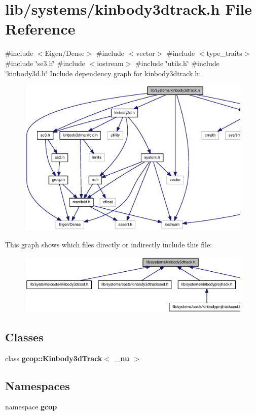 \section{lib/systems/kinbody3dtrack.h \-File \-Reference}
\label{kinbody3dtrack_8h}
{\ttfamily \#include $<$\-Eigen/\-Dense$>$}\*
{\ttfamily \#include $<$vector$>$}\*
{\ttfamily \#include $<$type\-\_\-traits$>$}\*
{\ttfamily \#include \char`\"{}se3.\-h\char`\"{}}\*
{\ttfamily \#include $<$iostream$>$}\*
{\ttfamily \#include \char`\"{}utils.\-h\char`\"{}}\*
{\ttfamily \#include \char`\"{}kinbody3d.\-h\char`\"{}}\*
\-Include dependency graph for kinbody3dtrack.\-h\-:\nopagebreak
\begin{figure}[H]
\begin{center}
\leavevmode
\includegraphics[width=350pt]{kinbody3dtrack_8h__incl}
\end{center}
\end{figure}
\-This graph shows which files directly or indirectly include this file\-:\nopagebreak
\begin{figure}[H]
\begin{center}
\leavevmode
\includegraphics[width=350pt]{kinbody3dtrack_8h__dep__incl}
\end{center}
\end{figure}
\subsection*{\-Classes}
\begin{DoxyCompactItemize}
\item 
class {\bf gcop\-::\-Kinbody3d\-Track$<$ \-\_\-nu $>$}
\end{DoxyCompactItemize}
\subsection*{\-Namespaces}
\begin{DoxyCompactItemize}
\item 
namespace {\bf gcop}
\end{DoxyCompactItemize}
